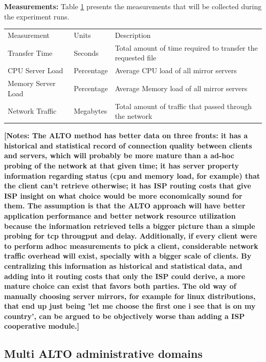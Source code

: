\textbf{Measurements:} Table \ref{table:s2-measurements} presents the measurements that will be collected during the experiment runs.

\begin{table}[]
\begin{tabular}{lll}
Measurement         & Units      & Description                                                  \\
Transfer Time       & Seconds    & Total amount of time required to transfer the requested file \\
CPU Server Load     & Percentage & Average CPU load of all mirror servers \\
Memory Server Load  & Percentage & Average Memory load of all mirror servers \\
Network Traffic     & Megabytes  & Total amount of traffic that passed through the network
\end{tabular}
\label{table:s2-measurements}
\end{table}

\textbf{[Notes: The ALTO method has better data on three fronts: it has a historical and statistical record of connection quality between clients and servers, which will probably be more mature than a ad-hoc probing of the network at that given time; it has server property information regarding status (cpu and memory load, for example) that the client can't retrieve otherwise; it has ISP routing costs that give ISP insight on what choice would be more economically sound for them. The assumption is that the ALTO approach will have better application performance and better network resource utilization because the information retrieved tells a bigger picture than a simple probing for tcp througput and delay. Additionally, if every client were to perform adhoc measurements to pick a client, considerable network traffic overhead will exist, specially with a bigger scale of clients. By centralizing this information as historical and statistical data, and adding into it routing costs that only the ISP could derive, a more mature choice can exist that favors both parties. The old way of manually choosing server mirrors, for example for linux distributions, that end up just being 'let me choose the first one i see that is on my country', can be argued to be objectively worse than adding a ISP cooperative module.]}


\subsection{Multi ALTO administrative domains}

